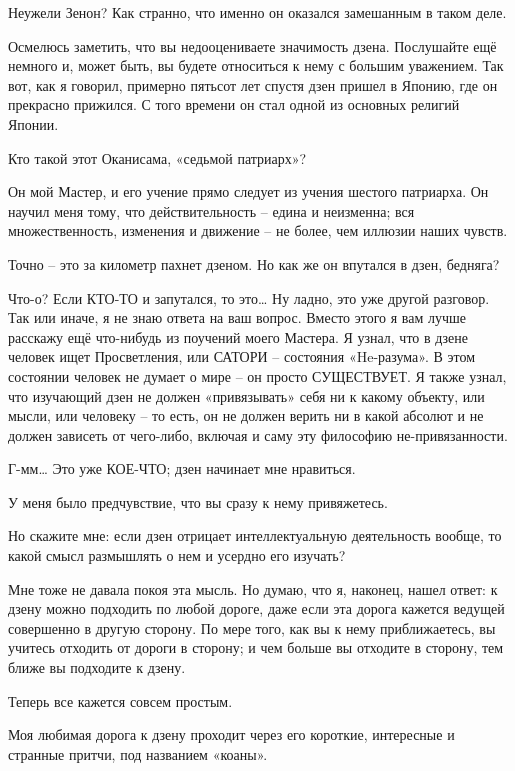 \documentclass[../main.tex]{subfiles}
\begin{document}
\begin{dialogue}
 Неужели Зенон? Как странно, что именно он оказался замешанным в таком деле.

 Осмелюсь заметить, что вы недооцениваете значимость дзена. Послушайте ещё немного и, может быть, вы будете относиться к нему с большим уважением. Так вот, как я говорил, примерно пятьсот лет спустя дзен пришел в Японию, где он прекрасно прижился. С того времени он стал одной из основных религий Японии.

 Кто такой этот Оканисама, «седьмой патриарх»?

 Он мой Мастер, и его учение прямо следует из учения шестого патриарха. Он научил меня тому, что действительность \--- едина и неизменна; вся множественность, изменения и движение \--- не более, чем иллюзии наших чувств.

 Точно \--- это за километр пахнет дзеном. Но как же он впутался в дзен, бедняга?

 Что-о? Если КТО-ТО и запутался, то это\ldots{} Ну ладно, это уже другой разговор. Так или иначе, я не знаю ответа на ваш вопрос. Вместо этого я вам лучше расскажу ещё что-нибудь из поучений моего Мастера. Я узнал, что в дзене человек ищет Просветления, или САТОРИ \--- состояния «He-разума». В этом состоянии человек не думает о мире \--- он просто СУЩЕСТВУЕТ\@. Я также узнал, что изучающий дзен не должен «привязывать» себя ни к какому объекту, или мысли, или человеку \--- то есть, он не должен верить ни в какой абсолют и не должен зависеть от чего-либо, включая и саму эту философию не-привязанности.

 Г-мм\ldots{} Это уже КОЕ-ЧТО; дзен начинает мне нравиться.

 У меня было предчувствие, что вы сразу к нему привяжетесь.

 Но скажите мне: если дзен отрицает интеллектуальную деятельность вообще, то какой смысл размышлять о нем и усердно его изучать?

 Мне тоже не давала покоя эта мысль. Но думаю, что я, наконец, нашел ответ: к дзену можно подходить по любой дороге, даже если эта дорога кажется ведущей совершенно в другую сторону. По мере того, как вы к нему приближаетесь, вы учитесь отходить от дороги в сторону; и чем больше вы отходите в сторону, тем ближе вы подходите к дзену.

 Теперь все кажется совсем простым.

 Моя любимая дорога к дзену проходит через его короткие, интересные и странные притчи, под названием «коаны».


\end{dialogue}
\end{document}
